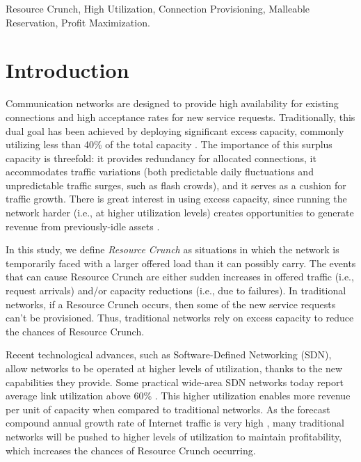 \documentclass[journal]{IEEEtran}
\begin{document}
\begin{IEEEkeywords}
Resource Crunch, High Utilization, Connection Provisioning, Malleable Reservation, Profit Maximization.
\end{IEEEkeywords}

\section{Introduction}

Communication networks are designed to provide high availability for existing connections and high acceptance rates for new service requests. Traditionally, this dual goal has been achieved by deploying significant excess capacity, commonly utilizing less than 40\% of the total capacity \cite{hong2013achieving, jain2013b4}. The importance of this surplus capacity is threefold: it provides redundancy for allocated connections, it accommodates traffic variations (both predictable daily fluctuations and unpredictable traffic surges, such as flash crowds), and it serves as a cushion for traffic growth. There is great interest in using excess capacity, since running the network harder (i.e., at higher utilization levels) creates opportunities to generate revenue from previously-idle assets \cite{Dikbiyik:2012:EEC:2182751.2182760}.

In this study, we define \textit{Resource Crunch} as situations in which the network is temporarily faced with a larger offered load than it can possibly carry. The events that can cause Resource Crunch are either sudden increases in offered traffic (i.e., request arrivals) and/or capacity reductions (i.e., due to failures). In traditional networks, if a Resource Crunch occurs, then some of the new service requests can't be provisioned. Thus, traditional networks rely on excess capacity to reduce the chances of Resource Crunch.

Recent technological advances, such as Software-Defined Networking (SDN), allow networks to be operated at higher levels of utilization, thanks to the new capabilities they provide. Some practical wide-area SDN networks today report average link utilization above 60\% \cite{hong2013achieving, jain2013b4, 7006776, Zhang:2017:GDI:3068707.3068746}. This higher utilization enables more revenue per unit of capacity when compared to traditional networks. As the forecast compound annual growth rate of Internet traffic is very high \cite{ciscofebruary}, many traditional networks will be pushed to higher levels of utilization to maintain profitability, which increases the chances of Resource Crunch occurring. %
\end{document}
